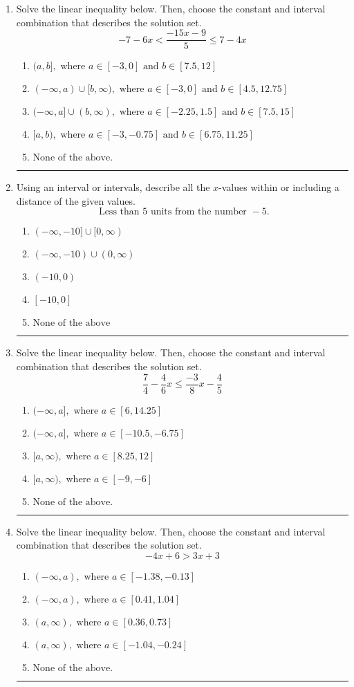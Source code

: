 \documentclass[14pt]{extbook}
\newcommand{\litem}[1]{\item#1\hspace*{-1cm}\rule{\textwidth}{0.4pt}}
\begin{document}
\begin{enumerate}
{\begin{enumerate}[label=\Alph*.]
\end{enumerate} }
\litem{
Solve the linear inequality below. Then, choose the constant and interval combination that describes the solution set.\[ -7 - 6 x < \frac{-15 x - 9}{5} \leq 7 - 4 x \]\begin{enumerate}[label=\Alph*.]
\item \( (a, b], \text{ where } a \in [-3, 0] \text{ and } b \in [7.5, 12] \)
\item \( (-\infty, a) \cup [b, \infty), \text{ where } a \in [-3, 0] \text{ and } b \in [4.5, 12.75] \)
\item \( (-\infty, a] \cup (b, \infty), \text{ where } a \in [-2.25, 1.5] \text{ and } b \in [7.5, 15] \)
\item \( [a, b), \text{ where } a \in [-3, -0.75] \text{ and } b \in [6.75, 11.25] \)
\item \( \text{None of the above.} \)

\end{enumerate} }
\litem{
Using an interval or intervals, describe all the $x$-values within or including a distance of the given values.\[ \text{ Less than } 5 \text{ units from the number } -5. \]\begin{enumerate}[label=\Alph*.]
\item \( (-\infty, -10] \cup [0, \infty) \)
\item \( (-\infty, -10) \cup (0, \infty) \)
\item \( (-10, 0) \)
\item \( [-10, 0] \)
\item \( \text{None of the above} \)

\end{enumerate} }
\litem{
Solve the linear inequality below. Then, choose the constant and interval combination that describes the solution set.\[ \frac{7}{4} - \frac{4}{6} x \leq \frac{-3}{8} x - \frac{4}{5} \]\begin{enumerate}[label=\Alph*.]
\item \( (-\infty, a], \text{ where } a \in [6, 14.25] \)
\item \( (-\infty, a], \text{ where } a \in [-10.5, -6.75] \)
\item \( [a, \infty), \text{ where } a \in [8.25, 12] \)
\item \( [a, \infty), \text{ where } a \in [-9, -6] \)
\item \( \text{None of the above}. \)

\end{enumerate} }
\litem{
Solve the linear inequality below. Then, choose the constant and interval combination that describes the solution set.\[ -4x + 6 > 3x + 3 \]\begin{enumerate}[label=\Alph*.]
\item \( (-\infty, a), \text{ where } a \in [-1.38, -0.13] \)
\item \( (-\infty, a), \text{ where } a \in [0.41, 1.04] \)
\item \( (a, \infty), \text{ where } a \in [0.36, 0.73] \)
\item \( (a, \infty), \text{ where } a \in [-1.04, -0.24] \)
\item \( \text{None of the above}. \)


\end{enumerate}}
\end{enumerate}
\end{document}
